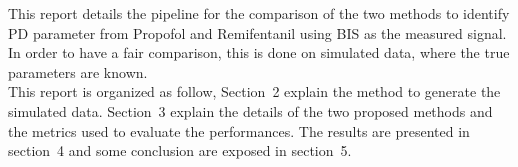 This report details the pipeline for the comparison of the two methods to identify PD parameter from Propofol and Remifentanil using BIS as the measured signal. In order to have a fair comparison, this is done on simulated data, where the true parameters are known.\\

This report is organized as follow, Section~2 explain the method to generate the simulated data. Section~3 explain the details of the two proposed methods and the metrics used to evaluate the performances. The results are presented in section~4 and some conclusion are exposed in section~5.